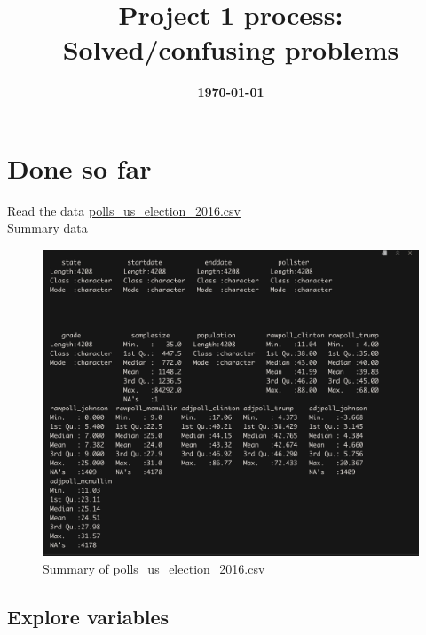 \documentclass[12pt]{article}
\title{\textbf{Project 1 process:\\Solved/confusing problems}}
\date{\textbf{\today}}
\begin{document}
	\maketitle
\tableofcontents
\newpage
	\thispagestyle{empty}
	\section{\textbf{Done so far}}
	Read the data \underline{polls\_us\_election\_2016.csv}\\
	Summary data
	\begin{figure}[h]
		\centering
		\includegraphics[width=1\textwidth]{summary.png} 
		\caption{Summary of polls\_us\_election\_2016.csv}
		\label{figure 1}
	\end{figure}
	\subsection{Explore variables}
	
\end{document}
